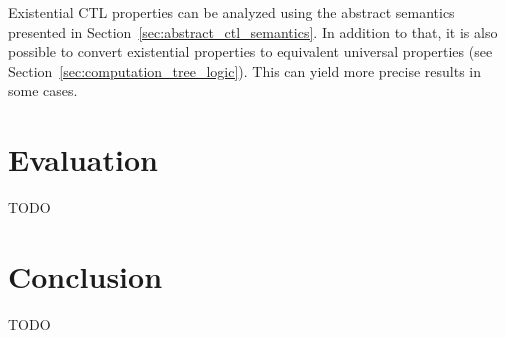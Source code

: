 \documentclass[11pt,a4paper,titlepage]{article}
\theoremstyle{definition}
\begin{document}
Existential CTL properties can be analyzed using the abstract semantics presented in Section~\ref{sec:abstract_ctl_semantics}. In addition to that, 
it is also possible to convert existential properties to equivalent universal properties (see Section~\ref{sec:computation_tree_logic}). 
This can yield more precise results in some cases.

\section{Evaluation}
TODO
\section{Conclusion}
TODO


\pagebreak



\end{document}
